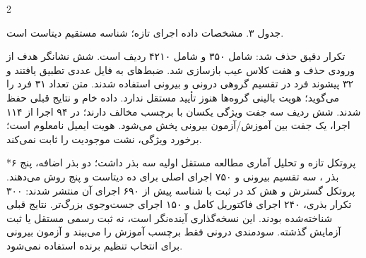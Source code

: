 \documentclass[10pt,a4paper]{article}
\makeatletter
\renewcommand{\section}{\@startsection{section}{1}{0pt}{5pt}{2pt}{\normalfont\normalsize\bfseries}}
\newcommand{\sect}[1]{\section*{#1}}
\makeatother
\begin{document}
\begin{multicols}{2}
\begin{minipage}{\linewidth}{\footnotesize جدول ۳. مشخصات داده اجرای تازه؛  شناسه مستقیم دیتاست  است.\par}
\begin{latin}
{\begin{tabularx}{\linewidth}
\bottomrule\end{tabularx}}
\end{latin}
\end{minipage}\par\vspace{3pt}
تکرار دقیق  حذف شد:  شامل ۳۵۰ و  شامل ۴۲۱۰ ردیف است. شش نشانگر هدف از ورودی  حذف و هفت کلاس عیب بازسازی شد. ضبط‌های  به فایل عددی  تطبیق یافتند و ۳۲ پیشوند فرد در تقسیم گروهی درونی و بیرونی استفاده شدند. متن  تعداد ۳۱ فرد را می‌گوید؛ هویت بالینی گروه‌ها هنوز تأیید مستقل ندارد. داده خام و نتایج قبلی حفظ شدند. شش ردیف  سه جفت ویژگی یکسان با برچسب مخالف دارند؛ در ۹۴ اجرا از ۱۱۴ اجرا، یک جفت بین آموزش/آزمون بیرونی پخش می‌شود. هویت ایمیل نامعلوم است؛ برخورد ویژگی، نشت موجودیت را ثابت نمی‌کند.

\sect{۶  پروتکل تازه و تحلیل آماری}
مطالعه مستقل اولیه سه بذر داشت؛ دو بذر اضافه، پنج بذر ، سه تقسیم بیرونی و ۷۵۰ اجرای اصلی برای ده دیتاست و پنج روش می‌دهند. پروتکل گسترش و هش کد در ثبت  با شناسه  پیش از ۶۹۰ اجرای آن منتشر شدند: ۳۰۰ تکرار بذری، ۲۴۰ اجرای فاکتوریل کامل و ۱۵۰ اجرای جست‌وجوی بزرگ‌تر. نتایج قبلی شناخته‌شده بودند. این نسخه‌گذاری آینده‌نگر است، نه ثبت رسمی مستقل یا ثبت آزمایش گذشته. سودمندی درونی فقط برچسب آموزش را می‌بیند و آزمون بیرونی برای انتخاب تنظیم برنده استفاده نمی‌شود.


\end{multicols}
\end{document}
